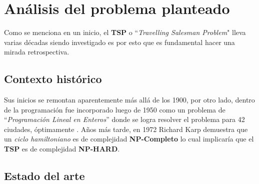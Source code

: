 
\titleformat{\chapter}[display]
    {\normalfont\Large\bfseries}{\filleft\chaptertitlename\ \thechapter}{20pt}{\Huge}
\chapter{Análisis del problema planteado}
    \justify    
        Como se menciona en un inicio, el \textbf{TSP} o ``\textit{Travelling Salesman Problem}" lleva varias décadas siendo investigado es por esto que es fundamental hacer una mirada retrospectiva. 
        
        \section{Contexto histórico}
            Sus inicios se remontan aparentemente más allá de los 1900, por otro lado, dentro de la programación fue incorporado luego de 1950 como un problema de ``\textit{Programación Lineal en Enteros}'' donde se logra resolver el problema para 42 ciudades, óptimamente \parencite{WikipediaTSP}.
            \newline
            \newline
            Años más tarde, en 1972 Richard Karp demuestra que un \textit{ciclo hamiltoniano} es de complejidad \textbf{NP-Completo} lo cual implicaría que el \textbf{TSP} es de complejidad \textbf{NP-HARD}.
            
        \section{Estado del arte}
            
